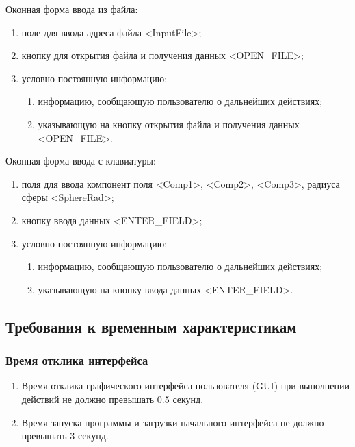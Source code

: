 \documentclass[14pt,a4paper,final]{extreport}
\begin{document}
Оконная форма ввода из файла:
\begin{enumerate}[label=\arabic*.,ref=\arabic*]
	\item поле для ввода адреса файла <InputFile>;
	\item кнопку для открытия файла и получения данных <OPEN\_FILE>;
	\item условно-постоянную информацию:
		\begin{enumerate}[label=\asbuk*)]
			\item информацию, сообщающую пользователю о дальнейших действиях;
			\item указывающую на кнопку открытия файла и получения данных <OPEN\_FILE>.
		\end{enumerate}
\end{enumerate}

\pagebreak %


Оконная форма ввода с клавиатуры:
\begin{enumerate}[label=\arabic*.,ref=\arabic*]
	\item поля для ввода компонент поля <Comp1>, <Comp2>, <Comp3>, радиуса сферы <SphereRad>;
	\item кнопку ввода данных <ENTER\_FIELD>;
	\item условно-постоянную информацию:
		\begin{enumerate}[label=\asbuk*)]
			\item информацию, сообщающую пользователю о дальнейших действиях;
			\item указывающую на кнопку ввода данных <ENTER\_FIELD>.
		\end{enumerate}
\end{enumerate}


\subsection{Требования к временным характеристикам}

\subsubsection{Время отклика интерфейса}
\begin{enumerate}[label=\asbuk*),ref=\asbuk*]
	\item Время отклика графического интерфейса пользователя (GUI) при выполнении действий не должно превышать 0.5 секунд.
	\item Время запуска программы и загрузки начального интерфейса не должно превышать 3 секунд.
\end{enumerate}
\end{document}
